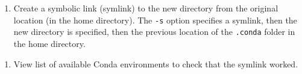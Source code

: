 \documentclass[
]{book}
\newenvironment{Shaded}{\begin{snugshade}}{\end{snugshade}}
\newcommand{\ErrorTok}[1]{\textcolor[rgb]{0.64,0.00,0.00}{\textbf{#1}}}
\newcommand{\NormalTok}[1]{#1}
\newcommand{\OperatorTok}[1]{\textcolor[rgb]{0.81,0.36,0.00}{\textbf{#1}}}
\newcommand{\StringTok}[1]{\textcolor[rgb]{0.31,0.60,0.02}{#1}}
\providecommand{\tightlist}{%
  \setlength{\itemsep}{0pt}\setlength{\parskip}{0pt}}
\begin{document}
\begin{Shaded}
\end{Shaded}

\begin{enumerate}
\def\labelenumi{\arabic{enumi}.}
\setcounter{enumi}{5}
\tightlist
\item
  Create a symbolic link (symlink) to the new directory from the original location (in the home directory). The \texttt{-s} option specifies a symlink, then the new directory is specified, then the previous location of the \texttt{.conda} folder in the home directory.
\end{enumerate}

\begin{Shaded}
\end{Shaded}

\begin{enumerate}
\def\labelenumi{\arabic{enumi}.}
\setcounter{enumi}{6}
\tightlist
\item
  View list of available Conda environments to check that the symlink worked.
\end{enumerate}

\begin{Shaded}
\end{Shaded}
\end{document}
